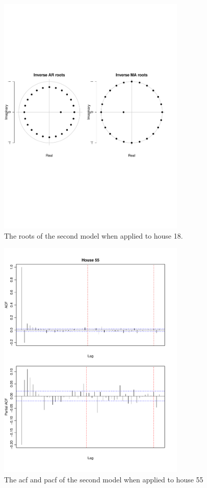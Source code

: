 \begin{figure}
    \centering
    \includegraphics[width=0.8\textwidth]{../../../figures/arimax/Roots_18.pdf}
    \caption{The roots of the second model when applied to house 18.}
    \label{fig:Model2_stationarity18}
\end{figure}    


\begin{figure}
    \centering
    \includegraphics[width=0.8\textwidth]{../../../figures/arimax/ACF_55_short.pdf}
    \caption{The acf and pacf of the second model when applied to house 55}
    \label{fig:Model2_acf_55}
\end{figure}    

